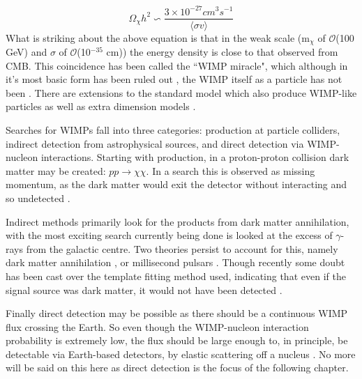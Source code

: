 \begin{equation}
    \Omega_\chi h^2 \backsim \frac{3\times 10^{-27} cm^3s^{-1}}{ \langle \sigma v \rangle}
\end{equation}
What is striking about the above equation is that in the weak scale (m$_\chi$ of $\mathcal{O}$(100 GeV) and $\sigma$ of $\mathcal{O}$(10$^{-35}$ cm)) the energy density is close to that observed from CMB.
This coincidence has been called the ``WIMP miracle", which although in it's most basic form has been ruled out \cite{less_of_a_wimp_miracle_ref}, the WIMP itself as a particle has not been \cite{wimp_theory_ref}.
There are extensions to the standard model which also produce WIMP-like particles \cite{supersymetry_wimpy_boi_ref,supersymetry_wimpy_again_ref} as well as extra dimension models \cite{extradimention_wimps_ref}.

\par
Searches for WIMPs fall into three categories: production at particle colliders, indirect detection from astrophysical sources, and direct detection via WIMP-nucleon interactions.
Starting with production, in a proton-proton collision dark matter may be created: $pp\xrightarrow{}\chi\chi$.
In a search this is observed as missing momentum, as the dark matter would exit the detector without interacting and so undetected \cite{lhc_darkmatter_ref}.
\par
Indirect methods primarily look for the products from dark matter annihilation, with the most exciting search currently being done is looked at the excess of $\gamma$-rays from the galactic centre.
Two theories persist to account for this, namely dark matter annihilation \cite{galactic_gamma_excess_1_ref, galactic_gamma_excess_2_ref}, or millisecond pulsars \cite{galactic_gamma_excess_3_ref, galactic_gamma_excess_4_ref}.
Though recently some doubt has been cast over the template fitting method used, indicating that even if the signal source was dark matter, it would not have been detected \cite{galactic_gamma_excess_5_ref}.
\par
Finally direct detection may be possible as there should be a continuous WIMP flux crossing the Earth.
So even though the WIMP-nucleon interaction probability is extremely low, the flux should be large enough to, in principle, be detectable via Earth-based detectors, by elastic scattering off a nucleus \cite{wimp_nucleon_interactions_first_suggestion_ref,supersymmetric_dark_matter_ref}.
No more will be said on this here as direct detection is the focus of the following chapter.

